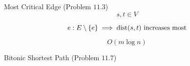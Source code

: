 \begin{frame}
  \begin{exampleblock}{Most Critical Edge (Problem $11.3$)}
    \[
      s, t \in V
    \]

    \[
      e: E \setminus \{e\} \implies \text{dist}(s,t) \text{ increases most}
    \]
  \end{exampleblock}

  \pause
  \vspace{0.30cm}
  \begin{quote}
	\centering
  \end{quote}

  \vspace{-0.50cm}
  \[
    O(m \log n)
  \]
\end{frame}

\begin{frame}
  \begin{exampleblock}{Bitonic Shortest Path (Problem $11.7$)}
  \end{exampleblock}

  \pause
  \vspace{0.30cm}
\end{frame}
